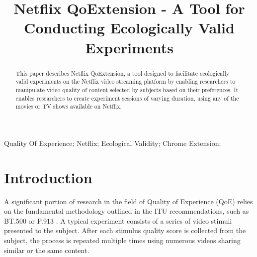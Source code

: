 \documentclass[conference]{IEEEtran}
\begin{document}
\title{Netflix QoExtension - A Tool for Conducting Ecologically Valid Experiments}

\author{




}
\maketitle

\begin{abstract}
    This paper describes Netflix QoExtension, a tool designed to facilitate ecologically valid experiments on the Netflix video streaming platform by enabling researchers to manipulate video quality of content selected by subjects based on their preferences. It enables researchers to create experiment sessions of varying duration, using any of the movies or TV shows available on Netflix.
\end{abstract}

\begin{IEEEkeywords}
    Quality Of Experience; Netflix; Ecological Validity; Chrome Extension;
\end{IEEEkeywords}

\section{Introduction}
\label{sec:Introduction}
    A significant portion of research in the field of Quality of Experience (QoE) relies on the fundamental methodology outlined in the ITU recommendations, such as BT.500 \cite{BT.500-14} or P.913 \cite{ITU-T-P.913}. A typical experiment consists of a series of video stimuli presented to the subject. After each stimulus quality score is collected from the subject, the process is repeated multiple times using numerous videos sharing similar or the same content. 
    
\end{document}
